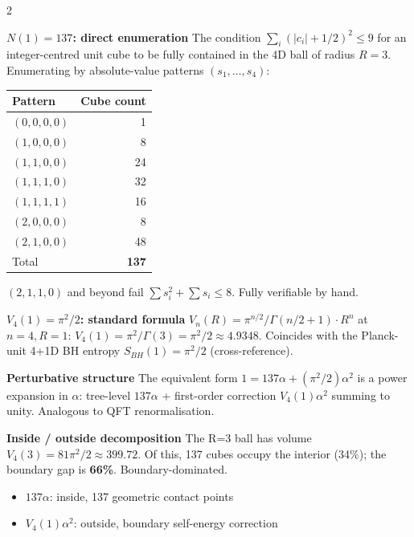 \documentclass[9pt,a4paper]{article}
\begin{document}
\vspace{2pt}

\begin{multicols}{2}
\small

\textbf{$N(1) = 137$: direct enumeration}\enspace
The condition $\sum_i (|c_i|+1/2)^2 \le 9$ for an integer-centred unit cube to be fully contained in the 4D ball of radius $R=3$. Enumerating by absolute-value patterns $(s_1,\ldots,s_4)$:

\vspace{1pt}
{\footnotesize
\begin{tabular}{@{}lr@{}}
\toprule
Pattern & Cube count \\
\midrule
$(0,0,0,0)$ & 1 \\
$(1,0,0,0)$ & 8 \\
$(1,1,0,0)$ & 24 \\
$(1,1,1,0)$ & 32 \\
$(1,1,1,1)$ & 16 \\
$(2,0,0,0)$ & 8 \\
$(2,1,0,0)$ & 48 \\
\midrule
Total & \textbf{137} \\
\bottomrule
\end{tabular}
}

\smallskip
$(2,1,1,0)$ and beyond fail $\sum s_i^2 + \sum s_i \le 8$. Fully verifiable by hand.

\smallskip
\textbf{$V_4(1) = \pi^2/2$: standard formula}\enspace
$V_n(R) = \pi^{n/2}/\Gamma(n/2+1) \cdot R^n$ at $n=4, R=1$: $V_4(1) = \pi^2/\Gamma(3) = \pi^2/2 \approx 4.9348$. Coincides with the Planck-unit 4+1D BH entropy $S_{BH}(1) = \pi^2/2$ (cross-reference).

\smallskip
\textbf{Perturbative structure}\enspace
The equivalent form $1 = 137\alpha + (\pi^2/2)\alpha^2$ is a power expansion in $\alpha$: tree-level $137\alpha$ + first-order correction $V_4(1)\alpha^2$ summing to unity. Analogous to QFT renormalisation.

\smallskip
\textbf{Inside / outside decomposition}\enspace
The R=3 ball has volume $V_4(3) = 81\pi^2/2 \approx 399.72$. Of this, 137 cubes occupy the interior (34\%); the boundary gap is \textbf{66\%}. Boundary-dominated.
\begin{itemize}[topsep=1pt]
\item $137\alpha$: inside, 137 geometric contact points
\item $V_4(1)\alpha^2$: outside, boundary self-energy correction
\end{itemize}


\end{multicols}
\end{document}
